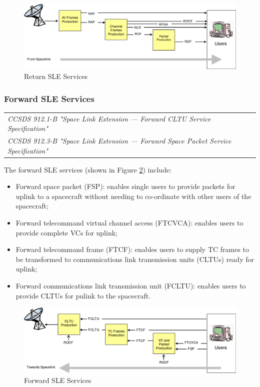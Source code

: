 \begin{figure}[h]
\centering\includegraphics[scale=0.3]{fig/return_sle_services}
\caption{Return SLE Services}
\label{fig:Return SLE Services}
\end{figure}

\subsubsection{Forward SLE Services}

\begin{tabular}{l}
\textit{CCSDS 912.1-B "Space Link Extension — Forward CLTU Service Specification" \cite{CCSDS-912.1-B}} \\
\textit{CCSDS 912.3-B "Space Link Extension — Forward Space Packet Service Specification" \cite{CCSDS-912.3-B}} \\
\end{tabular}

The forward SLE services (shown in Figure \ref{fig:Forward SLE Services}) include: 

\begin{itemize}
\item Forward space packet (FSP): enables single users to provide packets for uplink to a spacecraft without needing to co-ordinate with other users of the spacecraft;
\item Forward telecommand virtual channel access (FTCVCA): enables users to provide complete VCs for uplink;
\item Forward telecommand frame (FTCF): enables users to supply TC frames to be transformed to communications link transmission units (CLTUs) ready for uplink;
\item Forward communications link transmission unit (FCLTU): enables users to provide CLTUs for pulink to the spacecraft.
\end{itemize}

\begin{figure}[h]
\centering\includegraphics[scale=0.4]{fig/forward_sle_services}
\caption{Forward SLE Services}
\label{fig:Forward SLE Services}
\end{figure}

